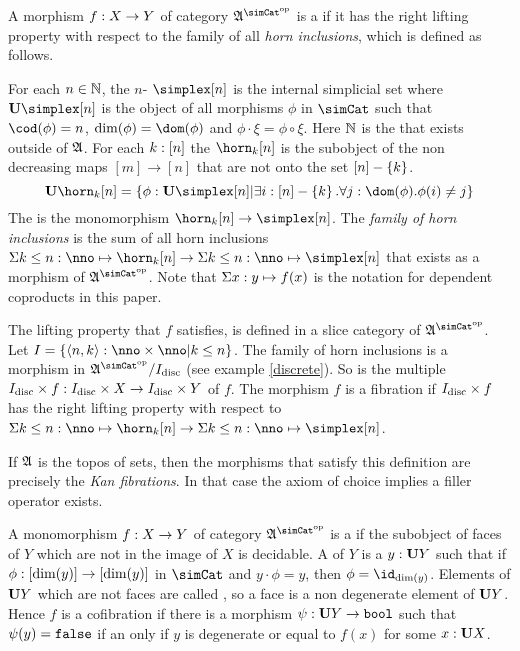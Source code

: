 \documentclass[csh.tex]{subfiles}
\begin{document}
\begin{definition} A morphism $f: X\to Y$ of category $\ambient\s$ is a  if it has the right lifting property with respect to the family of all \emph{horn inclusions}, which is defined as follows. 

For each $n\in\mathbb N$, the $n$- $\simplex[n]$ is the internal simplicial set where $\base{\simplex[n]}$ is the object of all morphisms $\phi$ in $\simCat$ such that $\cod(\phi) = n$, $\dim(\phi) = \dom(\phi)$ and $\phi\cdot \xi = \phi\circ \xi$. Here $\mathbb N$ is the  that exists outside of $\mathfrak A$. For each $k:[n]$ the  $\horn_k[n]$ is the subobject of the non decreasing maps $[m]\to [n]$ that are not onto the set $[n]-\left\{k\right\}$.
\[ \base{\horn_k[n]} = \set{\phi\of\base{\simplex[n]}| \exists i\of[n]-\set k.\forall j\of \dom(\phi).\phi(i)\neq j } \]
The  is the monomorphism $\horn_k[n]\to\simplex[n]$. The \emph{family of horn inclusions} is the sum of all horn inclusions $\coproduct{k\leq n\of\nno}{\horn_k[n]}\to \coproduct{k\leq n\of\nno}{\simplex[n]}$ that exists as a morphism of $\ambient\s$. Note that $\Sigma x: y \mapsto f(x)$ is the notation for dependent coproducts in this paper.

The lifting property that $f$ satisfies, is defined in a slice category of $\ambient\s$. Let $I = \set{\tuplet{n,k}\of\nno\times\nno|k\leq n}$. The family of horn inclusions is a morphism in $\ambient\s/I\disc$ (see example \ref{discrete}). So is the multiple $I_{\rm disc}\times f: I_{\rm disc}\times X\to I_{\rm disc}\times Y$ of $f$. The morphism $f$ is a fibration if $I_{\rm disc}\times f$ has the right lifting property with respect to $\coproduct{k\leq n\of\nno}{\horn_k[n]}\to \coproduct{k\leq n\of\nno}{\simplex[n]}$. 
\end{definition}

\begin{example} If $\mathfrak A$ is the topos of sets, then the morphisms that satisfy this definition are precisely the \emph{Kan fibrations}. In that case the axiom of choice implies a filler operator exists. \end{example}

\begin{definition} A monomorphism $f: X\to Y$ of category $\ambient\s$ is a  if the subobject of faces of $Y$ which are not in the image of $X$ is decidable. A  of $Y$ is a $y:\mathbf{U} Y$ such that if $\phi: [\dim(y)]\to [\dim(y)]$ in $\simCat$ and $y\cdot \phi = y$, then $\phi = \id_{\dim(y)}$. Elements of $\mathbf{U} Y$ which are not faces are called , so a face is a non degenerate element of $\mathbf{U} Y$. Hence $f$ is a cofibration if there is a morphism $\psi:\mathbf{U} Y\to\mathtt{bool}$ such that $\psi(y)=\mathtt{false}$ if an only if $y$ is degenerate or equal to $f(x)$ for some $x: \mathbf{U} X$.\end{definition}
\end{document}
